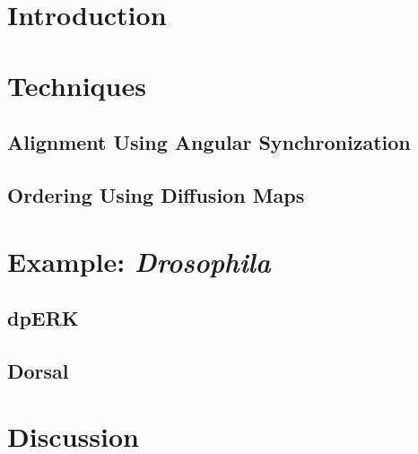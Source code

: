 \documentclass[12pt]{article}
\begin{document}
\section{Introduction}


\section{Techniques}


\subsection{Alignment Using Angular Synchronization}

\subsection{Ordering Using Diffusion Maps}

\section{Example: {\em Drosophila}}

\subsection{dpERK}

\subsection{Dorsal}

\section{Discussion}
\end{document}
